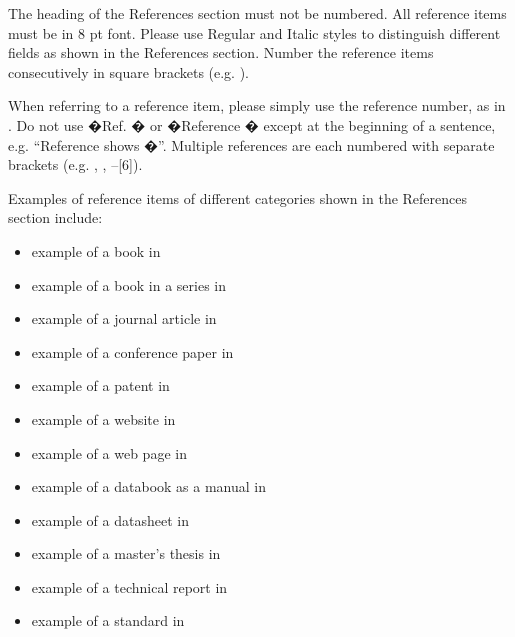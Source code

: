 \documentclass[10pt,conference,a4paper]{IEEEtran}
\begin{document}
The heading of the References section must not be numbered.
All reference items must be in 8 pt font.  Please
use Regular and Italic styles to distinguish different fields as
shown in the References section. Number the reference items
consecutively in square brackets (e.g. \cite{IEEEexample:book}).

When referring to a reference item, please simply use the
reference number, as in \cite{IEEEexample:bookwithseriesvolume}.
Do not use �Ref. \cite{IEEEexample:article_typical}� or
�Reference \cite{IEEEexample:article_typical}� except at the
beginning of a sentence, e.g.  ``Reference
\cite{IEEEexample:article_typical} shows �''.  Multiple
references are each numbered with separate brackets (e.g.
\cite{IEEEexample:bookwithseriesvolume},
\cite{IEEEexample:article_typical},
\cite{IEEEexample:confwithpaper}--[6]).

Examples of reference items of different categories shown in the
References section include:

\begin{itemize}
\item	example of a book in \cite{IEEEexample:book}
\item	example of a book in a series in \cite{IEEEexample:bookwithseriesvolume}
\item	example of a journal article in \cite{IEEEexample:article_typical}
\item	example of a conference paper in \cite{IEEEexample:confwithpaper}
\item	example of a patent in \cite{IEEEexample:uspat}
\item	example of a website in \cite{IEEEexample:IEEEwebsite}
\item	example of a web page in \cite{IEEEexample:shellCTANpage}
\item	example of a databook as a manual in \cite{IEEEexample:motmanual}
\item	example of a datasheet in \cite{IEEEexample:datasheet}
\item	example of a master's thesis in \cite{IEEEexample:masterstype}
\item	example of a technical report in \cite{IEEEexample:techreptype}
\item	example of a standard in \cite{IEEEexample:standard}
\end{itemize}

\enlargethispage{-62mm}
\end{document}
